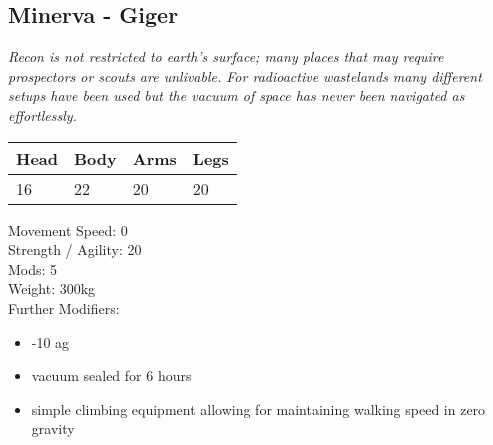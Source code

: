 \documentclass[12pt,a4paper,openany]{book}
\begin{document}
\begin{multicols}{2}
	\subsection{Minerva - Giger}
	\textit{Recon is not restricted to earth's surface; many places that may require prospectors or scouts are unlivable. For radioactive wastelands many different setups have been used but the vacuum of space has never been navigated as effortlessly.}\par
	\begin{tabular}{|l|l|l|l|}
		\hline
		Head & Body & Arms & Legs\\
		\hline
		16 & 22 & 20 & 20\\
		\hline
	\end{tabular}
	\par
	Movement Speed: 0\\
	Strength / Agility: 20\\
	Mods: 5\\
	Weight: 300kg\\
	Further Modifiers:
	\vspace{-8mm}
	\begin{itemize}
		\setlength\itemsep{-8mm}
		\item -10 ag
		\item vacuum sealed for 6 hours
		\item simple climbing equipment allowing for maintaining walking speed in zero gravity
	\end{itemize}
	\par
	\end{multicols}
\end{document}
